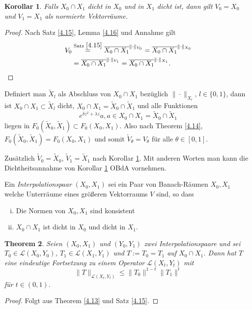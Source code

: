 \documentclass[
paper=a4,
bibtotocnumbered,
liststotocnumbered,
tablecaptionabove,
pointlessnumbers,
twoside,
openright,
10pt
]
{report}
\newtheorem{thm}{Theorem}[chapter]
\newtheorem{cor}[thm]{Korollar}
\theoremstyle{definition}
\numberwithin{equation}{chapter}
\begin{document}
\begin{cor}\label{4.17}
Falls $X_0 \cap X_1$ dicht in $X_0$ und in $X_1$ dicht ist, dann gilt $V_0 = X_0$ und $V_1 = X_1$ als normierte Vektorräume.
\end{cor}
\begin{proof}
Nach Satz \ref{4.15}, Lemma \ref{4.16} und Annahme gilt
\begin{align*}
V_0 &\stackrel{\text{Satz }\ref{4.15}}= \overline{X_0 \cap X_1}^{\| \cdot \|_{V_0}} = \overline{X_0 \cap X_1}^{\| \cdot \|_{X_0}}\\ 
&= \overline{X_0 \cap X_1}^{\| \cdot \|_{V_1}} = \overline{X_0\cap X_1}^{\| \cdot \|_{X_1}}.
\end{align*}
\end{proof}
Definiert man $\tilde X_l$ als Abschluss von $X_0\cap X_1$ bezüglich $\| \cdot \|_{X_l}$, $l\in \{0,1\}$, dann ist $X_0 \cap X_1 \subset \tilde X_l$ dicht, $X_0 \cap X_1 = \tilde X_0 \cap \tilde X_1$ und alle Funktionen 
\begin{equation}
e^{\delta z^2 + \lambda z} a, a\in X_0 \cap X_1 = \tilde X_0 \cap \tilde X_1
\end{equation}
liegen in $F_0 (\tilde X_0 , \tilde X_1)\subset F_0 (X_0, X_1)$. Also nach Theorem \ref{4.14}, $F_0(\tilde X_0, \tilde X_1)= F_0 (X_0, X_1)$ und somit $\tilde V_{\theta} = V_\theta$ für alle $\theta \in [0,1]$.


Zusätzlich $\tilde V_0 = \tilde X_0$, $\tilde V_1= \tilde X_1$ nach Korollar \ref{4.17}. Mit anderen Worten man kann die Dichtheitsannahme von Korollar \ref{4.17} OBdA vornehmen.

Ein \emph{Interpolationspaar} $(X_0, X_1)$ sei ein Paar von Banach-Räumen $X_0, X_1$ welche Unterräume eines größeren Vektorraums $V$ sind, so dass
\begin{enumerate}[(i)]
\item Die Normen von $X_0, X_1$ sind konsistent
\item $X_0 \cap X_1$ ist dicht in $X_0$ und dicht in $X_1$.
\end{enumerate}

\begin{thm}\label{4.18}
Seien $(X_0, X_1)$ und $(Y_0, Y_1)$ zwei Interpolationspaare und sei $T_0 \in \mathcal L(X_0, Y_0)$,  $T_1\in \mathcal  L(X_1, Y_1)$ und $T:= T_0 = T_1$  auf $X_0 \cap X_1$. Dann hat $T$ eine eindeutige Fortsetzung zu einem Operator $\mathcal L(X_t, Y_t)$ mit
\begin{equation}
\| T\|_{\mathcal L(X_t, Y_t)} \le \| T_0 \|^{1-t} \| T_1\|^t
\end{equation}
für $t\in (0,1)$.  
\end{thm}
\begin{proof}
Folgt aus Theorem \ref{4.13} und Satz \ref{4.15}.
\end{proof}
\end{document}
